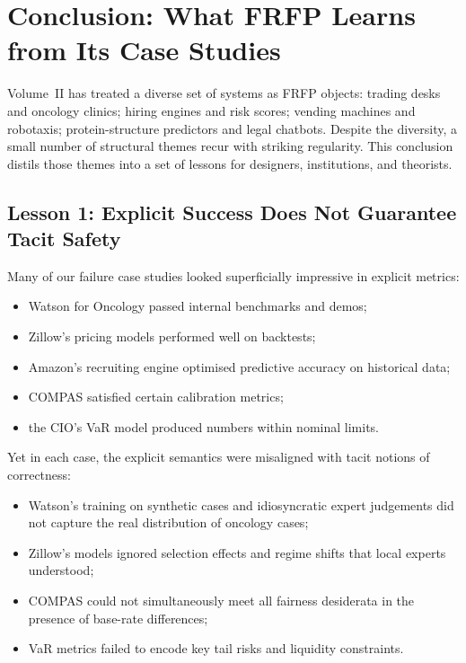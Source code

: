 \chapter*{Conclusion: What FRFP Learns from Its Case Studies}

Volume~II has treated a diverse set of systems as FRFP objects:
trading desks and oncology clinics; hiring engines and risk scores; vending machines and robotaxis; protein-structure predictors and legal chatbots.
Despite the diversity, a small number of structural themes recur with striking regularity.
This conclusion distils those themes into a set of lessons for designers, institutions, and theorists.

\section*{Lesson 1: Explicit Success Does Not Guarantee Tacit Safety}

Many of our failure case studies looked superficially impressive in explicit metrics:

\begin{itemize}
  \item Watson for Oncology passed internal benchmarks and demos;
  \item Zillow's pricing models performed well on backtests;
  \item Amazon's recruiting engine optimised predictive accuracy on historical data;
  \item COMPAS satisfied certain calibration metrics;
  \item the CIO's VaR model produced numbers within nominal limits.
\end{itemize}

Yet in each case, the explicit semantics were misaligned with tacit notions of correctness:

\begin{itemize}
  \item Watson's training on synthetic cases and idiosyncratic expert judgements did not capture the real distribution of oncology cases;
  \item Zillow's models ignored selection effects and regime shifts that local experts understood;
  \item COMPAS could not simultaneously meet all fairness desiderata in the presence of base-rate differences;
  \item VaR metrics failed to encode key tail risks and liquidity constraints.
\end{itemize}

